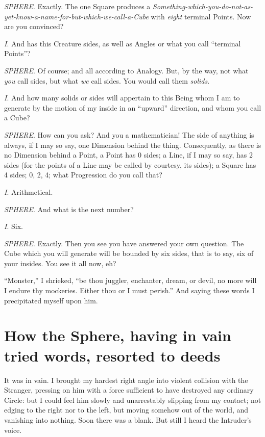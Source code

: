 \documentclass[10pt, kindle, oneside]{kindle}
\begin{document}
\emph{SPHERE}. Exactly. The one Square produces a
\emph{Something-which-you-do-not-as-yet-know-a-name-for-but-which-we-call-a-Cube}
with \emph{eight} terminal Points. Now are you convinced?

\emph{I}. And has this Creature sides, as well as Angles or what you call ``terminal
Points''?

\emph{SPHERE}. Of course; and all according to Analogy. But, by the way, not what \emph{you}
call sides, but what \emph{we} call sides. You would call them \emph{solids}.

\emph{I}. And how many solids or sides will appertain to this Being whom I am to
generate by the motion of my inside in an ``upward'' direction, and whom you
call a Cube?

\emph{SPHERE}. How can you ask? And you a mathematician! The side of anything is
always, if I may so say, one Dimension behind the thing. Consequently, as
there is no Dimension behind a Point, a Point has 0 sides; a Line, if I may so
say, has 2 sides (for the points of a Line may be called by courtesy, its
sides); a Square has 4 sides; 0, 2, 4; what Progression do you call that?

\emph{I}. Arithmetical.

\emph{SPHERE}. And what is the next number?

\emph{I}. Six.

\emph{SPHERE}. Exactly. Then you see you have answered your own question. The Cube
which you will generate will be bounded by six sides, that is to say, six of
your insides. You see it all now, eh?

``Monster,'' I shrieked, ``be thou juggler, enchanter, dream, or devil, no more
will I endure thy mockeries. Either thou or I must perish.'' And saying these
words I precipitated myself upon him.


\chapter{How the Sphere, having in vain tried words, resorted to deeds}


It was in vain. I brought my hardest right angle into violent collision with
the Stranger, pressing on him with a force sufficient to have destroyed any
ordinary Circle: but I could feel him slowly and unarrestably slipping from my
contact; not edging to the right nor to the left, but moving somehow out of
the world, and vanishing into nothing. Soon there was a blank. But still I
heard the Intruder's voice.
\end{document}
